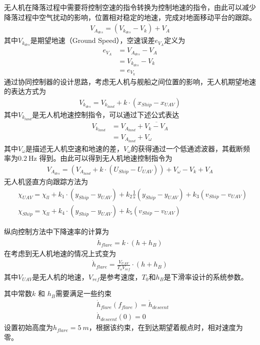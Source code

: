 无人机在降落过程中需要将控制空速的指令转换为控制地速的指令，由此可以减少降落过程中空气扰动的影响，位置相对稳定的地速，完成对地面移动平台的跟踪。
\begin{align}
V_{A_{des}} = (V_{k_{des}} -V_k) + V_A
\end{align}
其中$V_{k_{des}}$是期望地速（Ground Speed），空速误差$e_{V_A}$定义为
\begin{align}
e_{V_{A}} &= V_{A_{des}}-V_A \\
&= V_{k_{des}} - V_k \\
&= e_{V_k}
\end{align}
通过协同控制器的设计思路，考虑无人机与舰船之间位置的影响，无人机期望地速的表达方式为
\begin{align}
V_{k_{des}} = V_{k_{land}} + k \cdot (x_{Ship} - x_{UAV})
\end{align}
其中$V_{k_{land}}$是无人机地速控制指令，可以通过下述公式表达
\begin{align}
V_{k_{land}} &= V_{A_{land}} + \overline{V_k - V_A} \\
&= V_{A_{land}} + V_\omega
\end{align}
其中$V_\omega$是描述无人机空速和地速的差，$V_\omega$的获得通过一个低通滤波器，其截断频率为$0.2\ \text{Hz}$ 得到。由此可以得到无人机地速控制指令为
\begin{align}
V_{A_{des}} =( V_{A_{land}} + k \cdot (U_{Ship} - U_{UAV})) + V_\omega - V_k + V_A
\end{align}
无人机竖直方向跟踪方法为
\begin{align}
&\chi_{UAV} = \chi_{ll} + k_1 \cdot (y_{Ship} - y_{UAV}) +k_2 \frac{1}{s} (y_{Ship} - y_{UAV}) + k_3 (v_{Ship} - v_{UAV}) \\
&\chi_{Ship} = \chi_{ll} + k_4 \cdot (y_{Ship} - y_{UAV}) +  k_5 (v_{Ship} - v_{UAV})
\end{align}

纵向控制方法中下降速率的计算为
\begin{align}
\dot{h}_{flare} = k \cdot (h + h_B)
\end{align}
在考虑到无人机地速的情况上式变为
\begin{align}
\dot{h}_{flare} = \frac{V_{UAV}}{T_o V_{ref}} \cdot (h + h_B)
\end{align}
其中$V_{UAV}$是无人机的地速，$V_{ref}$是参考速度，$T_0$和$h_B$是下滑率设计的系统参数。

其中常数$k$ 和 $h_B$需要满足一些约束
\begin{align}
&\dot{h}_{flare} (f_{flare}) = \dot{h}_{descent} \\
&\dot{h}_{descent}(0)  = 0
\end{align}
设置初始高度为$h_{flare} = 5\ m$，根据该约束，在到达期望着舰点时，相对速度为零。

